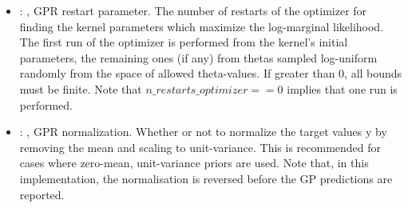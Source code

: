 \begin{itemize}
\begin{itemize}
        \item {}: , 
          GPR restart parameter. The number of restarts of the optimizer for finding the
          kernel parameters which maximize the log-marginal likelihood. The first run of the
          optimizer                                                  is performed from the kernel’s
          initial parameters, the remaining ones (if any) from thetas
          sampled log-uniform randomly from the space of allowed theta-values. If greater than 0,
          all bounds must be finite. Note that $n\_restarts\_optimizer == 0$ implies that one run is
          performed.

        \item {}: , 
          GPR normalization. Whether or not to normalize the target values y by removing the mean
          and scaling                                                  to unit-variance. This is
          recommended for cases where zero-mean, unit-variance priors are used.
          Note that, in this implementation, the normalisation is reversed before the GP predictions
          are reported.
      \end{itemize}
  \end{itemize}
